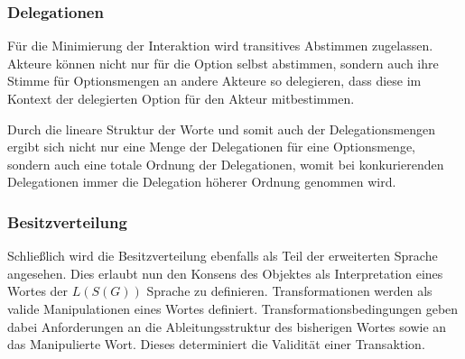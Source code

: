 \documentclass[]{article}
\begin{document}


\subsubsection*{Delegationen}

Für die Minimierung der Interaktion wird transitives Abstimmen zugelassen. Akteure können nicht nur für die Option selbst abstimmen, sondern auch ihre Stimme für Optionsmengen an andere Akteure so delegieren, dass diese im Kontext der delegierten Option für den Akteur mitbestimmen.

Durch die lineare Struktur der Worte und somit auch der Delegationsmengen ergibt sich nicht nur eine Menge der Delegationen für eine Optionsmenge, sondern auch eine totale Ordnung der Delegationen, womit bei konkurierenden Delegationen immer die Delegation höherer Ordnung genommen wird. 




\subsubsection*{Besitzverteilung}

Schließlich wird die Besitzverteilung ebenfalls als Teil der erweiterten Sprache angesehen. Dies erlaubt nun den Konsens des Objektes als Interpretation eines Wortes der $L(S(G))$ Sprache zu definieren. Transformationen werden als valide Manipulationen eines Wortes definiert. Transformationsbedingungen geben dabei Anforderungen an die Ableitungsstruktur des bisherigen Wortes sowie an das Manipulierte Wort. Dieses determiniert die Validität einer Transaktion.
\end{document}
